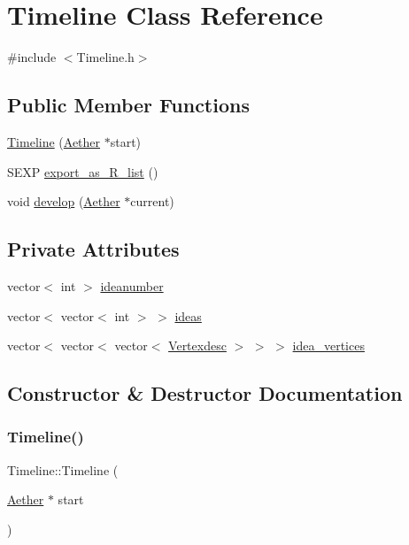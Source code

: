\hypertarget{classTimeline}{}\section{Timeline Class Reference}
\label{classTimeline}


{\ttfamily \#include $<$Timeline.\+h$>$}

\subsection*{Public Member Functions}
\begin{DoxyCompactItemize}
\item 
\hyperlink{classTimeline_a4b7918e9b25ad2ae37404ae800dcbafe}{Timeline} (\hyperlink{classAether}{Aether} $\ast$start)
\item 
S\+E\+XP \hyperlink{classTimeline_a75c810609b7a509757af93a75c3192e9}{export\+\_\+as\+\_\+\+R\+\_\+list} ()
\item 
void \hyperlink{classTimeline_af4e5c180f3615b470a6263ea51f10f84}{develop} (\hyperlink{classAether}{Aether} $\ast$current)
\end{DoxyCompactItemize}
\subsection*{Private Attributes}
\begin{DoxyCompactItemize}
\item 
vector$<$ int $>$ \hyperlink{classTimeline_a80c4c6c36d9700788e2d3bb6755b6320}{ideanumber}
\item 
vector$<$ vector$<$ int $>$ $>$ \hyperlink{classTimeline_a74b605f174f47ea189b2ba88fe9c92f1}{ideas}
\item 
vector$<$ vector$<$ vector$<$ \hyperlink{Networkland_8h_af340ced64bd0b6914662d1b26be70b41}{Vertexdesc} $>$ $>$ $>$ \hyperlink{classTimeline_ab90e68a8988c9cce4d3e258bf4845f50}{idea\+\_\+vertices}
\end{DoxyCompactItemize}


\subsection{Constructor \& Destructor Documentation}
\mbox{\label{classTimeline_a4b7918e9b25ad2ae37404ae800dcbafe}} 
\subsubsection{\texorpdfstring{Timeline()}{Timeline()}}
{\footnotesize\ttfamily Timeline\+::\+Timeline (\begin{DoxyParamCaption}\item[{\hyperlink{classAether}{Aether} $\ast$}]{start }\end{DoxyParamCaption})}



